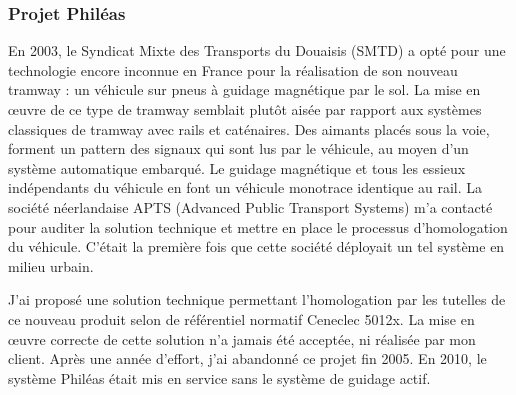 \documentclass[a4paper,12pt]{article}
\begin{document}
\subsubsection{Projet Phil\'eas}
En 2003, le Syndicat Mixte des Transports du Douaisis (SMTD) a opt\'e
pour une technologie encore inconnue en France pour la r\'ealisation
de son nouveau tramway : un v\'ehicule sur pneus \`a guidage
magn\'etique par le sol.  La mise en \oe{}uvre de ce type de tramway
semblait plut\^ot ais\'ee par rapport aux syst\`emes classiques de
tramway avec rails et cat\'enaires.  Des aimants plac\'es sous la
voie, forment un pattern des signaux qui sont lus par le v\'ehicule,
au moyen d'un syst\`eme automatique embarqu\'e.  Le guidage
magn\'etique et tous les essieux ind\'ependants du v\'ehicule en font
un v\'ehicule monotrace identique au rail.  La soci\'et\'e
n\'eerlandaise APTS (Advanced Public Transport Systems) m'a contact\'e
pour auditer la solution technique et mettre en place le processus
d'homologation du v\'ehicule. C'\'etait la premi\`ere fois que cette
soci\'et\'e d\'eployait un tel syst\`eme en milieu urbain.

J'ai propos\'e une solution technique permettant l'homologation par
les tutelles de ce nouveau produit selon de r\'ef\'erentiel normatif
Ceneclec 5012x. La mise en \oe{}uvre correcte de cette solution n'a
jamais \'et\'e accept\'ee, ni r\'ealis\'ee par mon client. Apr\`es une
ann\'ee d'effort, j'ai abandonn\'e ce projet fin 2005.  En 2010, le
syst\`eme Phil\'eas \'etait mis en service sans le syst\`eme de
guidage actif.
\end{document}
